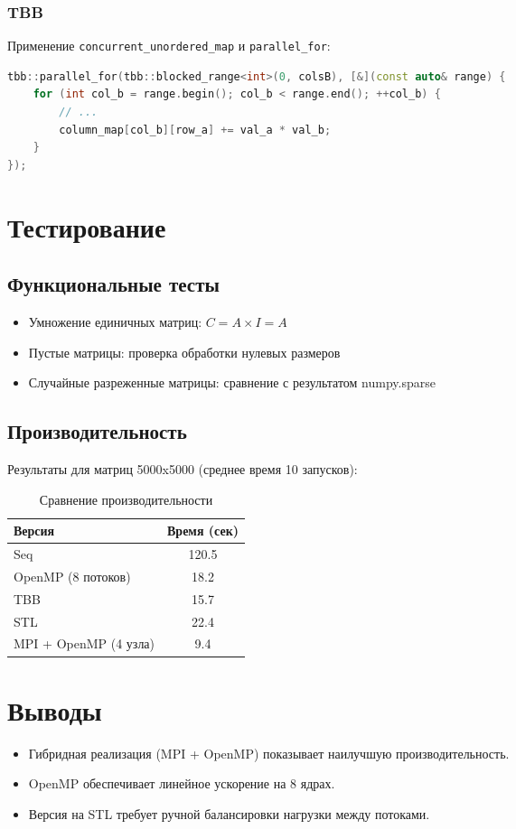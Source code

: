 \documentclass[12pt]{article}
\begin{document}
\subsubsection{TBB}
Применение \texttt{concurrent\_unordered\_map} и \texttt{parallel\_for}:
\begin{lstlisting}[language=C++, caption=Фрагмент кода TBB]
tbb::parallel_for(tbb::blocked_range<int>(0, colsB), [&](const auto& range) {
    for (int col_b = range.begin(); col_b < range.end(); ++col_b) {
        // ...
        column_map[col_b][row_a] += val_a * val_b;
    }
});
\end{lstlisting}

\section{Тестирование}
\subsection{Функциональные тесты}
\begin{itemize}
    \item Умножение единичных матриц: \( C = A \times I = A \)
    \item Пустые матрицы: проверка обработки нулевых размеров
    \item Случайные разреженные матрицы: сравнение с результатом numpy.sparse
\end{itemize}

\subsection{Производительность}
Результаты для матриц 5000x5000 (среднее время 10 запусков):
\begin{table}[h]
\centering
\begin{tabular}{|l|c|}
\hline
Версия & Время (сек) \\ \hline
Seq & 120.5 \\ \hline
OpenMP (8 потоков) & 18.2 \\ \hline
TBB & 15.7 \\ \hline
STL & 22.4 \\ \hline
MPI + OpenMP (4 узла) & 9.4 \\ \hline
\end{tabular}
\caption{Сравнение производительности}
\end{table}

\section{Выводы}
\begin{itemize}
    \item Гибридная реализация (MPI + OpenMP) показывает наилучшую производительность.
    \item OpenMP обеспечивает линейное ускорение на 8 ядрах.
    \item Версия на STL требует ручной балансировки нагрузки между потоками.
\end{itemize}
\end{document}
